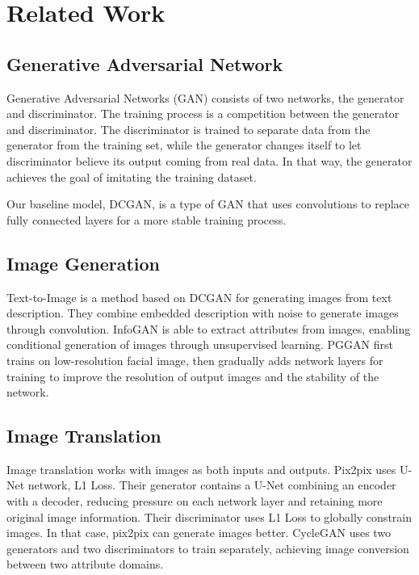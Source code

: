\section{Related Work}


\subsection{Generative Adversarial Network}
Generative Adversarial Networks (GAN) consists of two networks, the generator and discriminator.
The training process is a competition between the generator and discriminator.
The discriminator is trained to separate data from the generator from the training set,
    while the generator changes itself to let discriminator believe its output coming from real data.
In that way, the generator achieves the goal of imitating the training dataset.

Our baseline model, DCGAN, is a type of GAN that uses convolutions to replace fully connected layers for a more stable training process.


\subsection{Image Generation}

Text-to-Image is a method based on DCGAN for generating images from text description.
They combine embedded description with noise to generate images through convolution.
InfoGAN is able to extract attributes from images, enabling conditional generation of images through unsupervised learning.
PGGAN first trains on low-resolution facial image, then gradually adds network layers for training to improve the resolution of output images and the stability of the network.

\subsection{Image Translation}
Image translation works with images as both inputs and outputs.
Pix2pix uses U-Net network, L1 Loss.
Their generator contains a U-Net combining an encoder with a decoder,
    reducing pressure on each network layer and retaining more original image information.
Their discriminator uses L1 Loss to globally constrain images.
In that case, pix2pix can generate images better.
CycleGAN uses two generators and two discriminators to train separately, achieving image conversion between two attribute domains.

